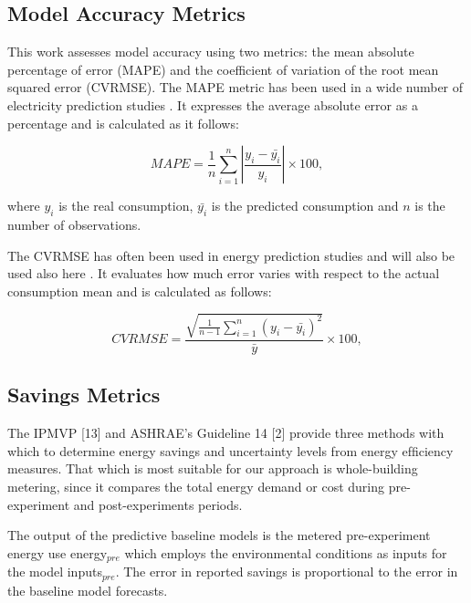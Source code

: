 \documentclass[10pt, conference, compsocconf]{IEEEtran}
\begin{document}
\subsection{Model Accuracy Metrics}

This work assesses model accuracy using two metrics: the mean absolute percentage of error (MAPE) and the coefficient of variation of the root mean squared error (CVRMSE).
The MAPE metric has been used in a wide number of electricity prediction studies \cite{fan2014development, edwards2012predicting}
. It expresses the average absolute error as a percentage and is calculated as it follows:

\[
 MAPE = \frac{1}{n}\sum_{i=1}^{n} |\frac{y_i-\bar{y_i}}{y_i}|\times 100,
\]

where $y_i$ is the real consumption, $\bar{y_i}$ is the predicted consumption and $n$ is the number of observations.

The CVRMSE has often been used in energy prediction studies \cite{quilumba2015using} and will also be used also here %
. It evaluates how much error varies with respect
to the actual consumption mean and is calculated as follows:

\[
 CVRMSE = \frac{\sqrt{\frac{1}{n-1}\sum_{i=1}^{n}(y_i-\bar{y_i})^2}}{\bar{y}} \times 100,
\]


\subsection{Savings Metrics}

The IPMVP [13] and ASHRAE’s Guideline 14 [2] provide three methods with which to determine energy savings and uncertainty levels from energy efﬁciency measures. That which is most suitable for our approach is whole-building metering, since it compares the total energy demand or cost during pre-experiment and post-experiments periods.


The output of the predictive baseline models is the metered pre-experiment energy use energy$_{pre}$ which employs the environmental conditions as inputs for the model inputs$_{pre}$. The error in reported savings is proportional to the error in the baseline model forecasts.
\end{document}
